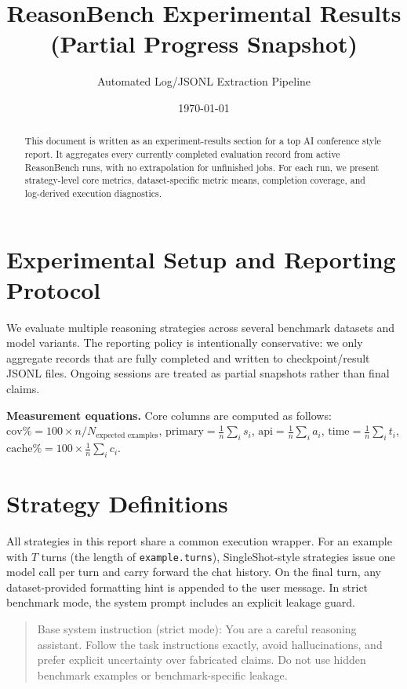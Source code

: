 \documentclass[10pt,twocolumn]{article}
\title{ReasonBench Experimental Results (Partial Progress Snapshot)}
\author{Automated Log/JSONL Extraction Pipeline}
\date{\today}
\begin{document}
\maketitle
\begin{abstract}
This document is written as an experiment-results section for a top AI conference style report. It aggregates every currently completed evaluation record from active ReasonBench runs, with no extrapolation for unfinished jobs. For each run, we present strategy-level core metrics, dataset-specific metric means, completion coverage, and log-derived execution diagnostics.
\end{abstract}
\section*{Experimental Setup and Reporting Protocol}
We evaluate multiple reasoning strategies across several benchmark datasets and model variants. The reporting policy is intentionally conservative: we only aggregate records that are fully completed and written to checkpoint/result JSONL files. Ongoing sessions are treated as partial snapshots rather than final claims.

\textbf{Measurement equations.} Core columns are computed as follows: $\mathrm{cov\%}=100\times n/N_{\text{expected examples}}$, $\mathrm{primary}=\frac{1}{n}\sum_i s_i$, $\mathrm{api}=\frac{1}{n}\sum_i a_i$, $\mathrm{time}=\frac{1}{n}\sum_i t_i$, $\mathrm{cache\%}=100\times\frac{1}{n}\sum_i c_i$.
\section*{Strategy Definitions}
All strategies in this report share a common execution wrapper. For an example with $T$ turns (the length of \texttt{example.turns}), SingleShot-style strategies issue one model call per turn and carry forward the chat history. On the final turn, any dataset-provided formatting hint is appended to the user message. In strict benchmark mode, the system prompt includes an explicit leakage guard.

\begin{quote}\footnotesize
Base system instruction (strict mode): You are a careful reasoning assistant. Follow the task instructions exactly, avoid hallucinations, and prefer explicit uncertainty over fabricated claims. Do not use hidden benchmark examples or benchmark-specific leakage.
\end{quote}
\end{document}
